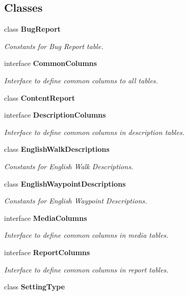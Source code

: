 \subsection*{Classes}
\begin{DoxyCompactItemize}
\item 
class {\bfseries Bug\+Report}
\begin{DoxyCompactList}\small\item\em Constants for Bug Report table. \end{DoxyCompactList}\item 
interface {\bfseries Common\+Columns}
\begin{DoxyCompactList}\small\item\em Interface to define common columns to all tables. \end{DoxyCompactList}\item 
class {\bfseries Content\+Report}
\item 
interface {\bfseries Description\+Columns}
\begin{DoxyCompactList}\small\item\em Interface to define common columns in description tables. \end{DoxyCompactList}\item 
class {\bfseries English\+Walk\+Descriptions}
\begin{DoxyCompactList}\small\item\em Constants for English Walk Descriptions. \end{DoxyCompactList}\item 
class {\bfseries English\+Waypoint\+Descriptions}
\begin{DoxyCompactList}\small\item\em Constants for English Waypoint Descriptions. \end{DoxyCompactList}\item 
interface {\bfseries Media\+Columns}
\begin{DoxyCompactList}\small\item\em Interface to define common columns in media tables. \end{DoxyCompactList}\item 
interface {\bfseries Report\+Columns}
\begin{DoxyCompactList}\small\item\em Interface to define common columns in report tables. \end{DoxyCompactList}\item 
class {\bfseries Setting\+Type}

\end{DoxyCompactItemize}
